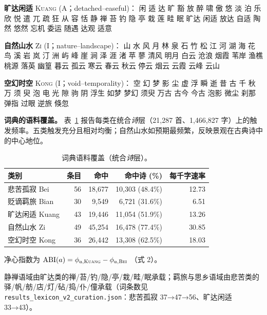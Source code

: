 \documentclass[11pt]{article}
\begin{document}
\smallskip
\noindent\textbf{旷达闲适} \textsc{Kuang} (A；detached–easeful)：
闲 适 达 旷 豁 放 醉 啸 傲 悠 淡 泊 乐 欣 悦 遣 兀 疏 狂 从 容 恬 静 禅 苔 钓 隐 亭 栽 莲 畦 眠
旷达 闲适 放达 自适 陶然 悠然 忘机 委运 随遇 达观 适意

\smallskip
\noindent\textbf{自然山水} \textsc{Zi} (I；nature–landscape)：
山 水 风 月 林 泉 石 竹 松 江 河 湖 海 花 鸟 溪 岩 岚 汀 洲 屿 峰 崖 涧 泽 涯 渚 苹 蓼
清风 明月 白云 沧浪 烟霞 苇岸 渔樵 桃源 落英 幽篁 暮云 孤云 寒云 春云 秋云 停云 烟云 云霞 云峰 云山

\smallskip
\noindent\textbf{空幻时空} \textsc{Kong} (I；void–temporality)：
空 幻 梦 影 尘 虚 浮 瞬 逝 昔 古 千 秋 万 须 臾 泡 电 光 隙 驹 阴
浮生 如梦 梦幻 须臾 万古 古今 今古 泡影 微尘 刹那 弹指 过眼 逆旅 倏忽

\smallskip
\noindent\textbf{词典的语料覆盖。}
表~\ref{tab:lexfreq} 报告每类在统合\emph{诗}层（21{,}287 首、1{,}466{,}827 字）上的触发频率。五类触发充分且相对均衡；自然山水如预期最频繁，反映景观在古典诗中的中心地位。

\begin{table}[H]
\centering\small
\caption{词典语料覆盖（统合\emph{诗}层）。}
\label{tab:lexfreq}
\begin{tabular}{lrrrr}
\toprule
类别 & 条目 & 命中 & 命中诗 (\%) & 每千字速率\\
\midrule
悲苦孤寂 Bei & 56 & 18,677 & 10,303 (48.4\%) & 12.73\\
贬谪羁旅 Bian & 30 & 9,549 & 6,721 (31.6\%) & 6.51\\
旷达闲适 Kuang & 43 & 19,446 & 11,054 (51.9\%) & 13.26\\
自然山水 Zi & 49 & 45,254 & 16,478 (77.4\%) & 30.85\\
空幻时空 Kong & 36 & 26,442 & 13,308 (62.5\%) & 18.03\\
\bottomrule
\end{tabular}
\end{table}

\noindent 净心指数为
$\mathrm{ABI}(a)=\phi_{a,\textsc{Kuang}}-\phi_{a,\textsc{Bei}}$
（式 2）。

\noindent 静禅语域由旷达类的禅/苔/钓/隐/亭/栽/畦/眠承载；羁旅与思乡语域由悲苦类的驿/帆/舫/店/灯/砧/捣/仆/僮承载（词条数见 \texttt{results\_lexicon\_v2\_curation.json}：悲苦孤寂 37→47→56、旷达闲适 33→43）。
\end{document}
